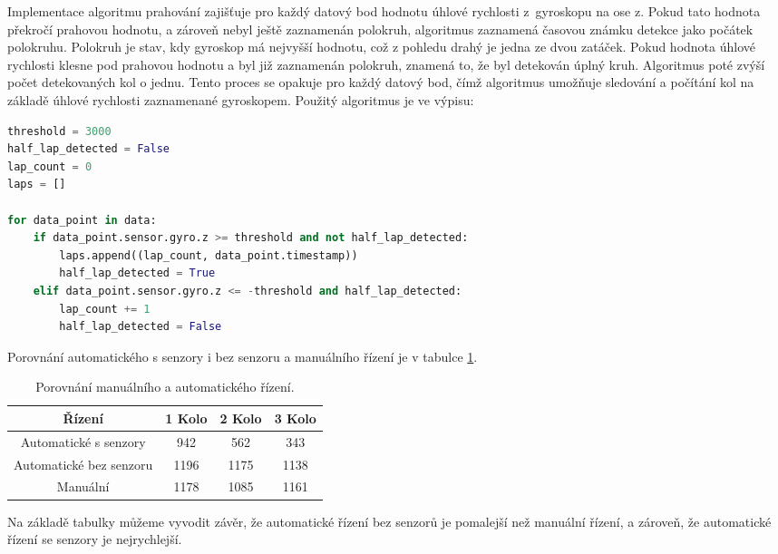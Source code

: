 Implementace algoritmu prahování zajišťuje pro každý datový bod hodnotu úhlové
rychlosti z~gyroskopu na ose z. Pokud tato hodnota překročí prahovou hodnotu, a
zároveň nebyl ještě zaznamenán polokruh, algoritmus zaznamená časovou známku detekce
jako počátek polokruhu. Polokruh je stav, kdy gyroskop má nejvyšší hodnotu, což z pohledu drahý je jedna ze dvou zatáček. Pokud hodnota úhlové rychlosti klesne pod prahovou hodnotu a
byl již zaznamenán polokruh, znamená to, že byl detekován úplný kruh. Algoritmus
poté zvýší počet detekovaných kol o jednu. Tento proces se opakuje pro každý datový
bod, čímž algoritmus umožňuje sledování a počítání kol na základě úhlové rychlosti
zaznamenané gyroskopem. Použitý algoritmus je ve výpisu:
\begin{lstlisting}[language = python, caption = Počet kol, label = lst:countLap]
threshold = 3000
half_lap_detected = False
lap_count = 0
laps = []

for data_point in data:
    if data_point.sensor.gyro.z >= threshold and not half_lap_detected:
        laps.append((lap_count, data_point.timestamp))
        half_lap_detected = True
    elif data_point.sensor.gyro.z <= -threshold and half_lap_detected:
        lap_count += 1
        half_lap_detected = False
\end{lstlisting}

Porovnání automatického s senzory i bez senzoru a manuálního řízení je v tabulce \ref{tab:Comparison}.
\begin{table}[!h]
    \centering
    \begin{tabular}{cccc}
        \hline
        \textbf{Řízení} & \textbf{1 Kolo} & \textbf{2 Kolo} & \textbf{3 Kolo} \\
        \hline
        Automatické s senzory          & 942       & 562 & 343          \\
        Automatické bez senzoru & 1196 & 1175 & 1138 \\
        Manuální 			  & 1178       & 1085 & 1161           \\
        \hline
    \end{tabular}
    \caption{Porovnání manuálního a automatického řízení.}
    \label{tab:Comparison}
\end{table}


Na základě tabulky můžeme vyvodit závěr, že automatické řízení bez senzorů je pomalejší než manuální řízení, a zároveň, že automatické řízení se senzory je nejrychlejší.

\endinput
